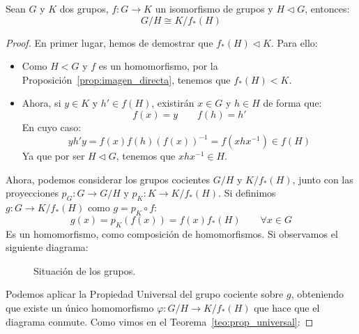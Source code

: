 \begin{lema}
    Sean $G$ y $K$ dos grupos, $f:G\to K$ un isomorfismo de grupos y $H\lhd G$, entonces:
    \begin{equation*}
        G/H \cong K/f_\ast(H)
    \end{equation*}
    \begin{proof}
        En primer lugar, hemos de demostrar que $f_\ast(H)\lhd K$. Para ello:
        \begin{itemize}
            \item Como $H<G$ y $f$ es un homomorfismo, por la Proposición~\ref{prop:imagen_directa}, tenemos que $f_\ast(H) < K$.
            \item Ahora, si $y\in K$ y $h'\in f(H)$, existirán $x\in G$ y $h\in H$ de forma que:
                \begin{equation*}
                    f(x) = y \qquad f(h) = h'
                \end{equation*}
                En cuyo caso:
                \begin{equation*}
                    yh'y = f(x)f(h){(f(x))}^{-1} = f(xhx^{-1}) \in f(H)
                \end{equation*}
                Ya que por ser $H\lhd G$, tenemos que $xhx^{-1}\in H$.
        \end{itemize}
        Ahora, podemos considerar los grupos cocientes $G/H$ y $K/f_\ast(H)$, junto con las proyecciones $p_G:G\to G/H$ y $p_K:K\to K/f_\ast(H)$. Si definimos $g:G\to K/f_\ast(H)$ como $g = p_K\circ f$:
        \begin{equation*}
            g(x) = p_K(f(x)) = f(x)f_\ast(H) \qquad \forall x\in G
        \end{equation*}
        Es un homomorfismo, como composición de homomorfismos. Si observamos el siguiente diagrama:
        \begin{figure}[H]
            \centering
            \caption{Situación de los grupos.}
        \end{figure}
        \noindent
        Podemos aplicar la Propiedad Universal del grupo cociente sobre $g$, obteniendo que existe un único homomorfismo $\varphi:G/H\to K/f_\ast(H)$ que hace que el diagrama conmute. Como vimos en el Teorema~\ref{teo:prop_universal}:

\end{proof}
\end{lema}
